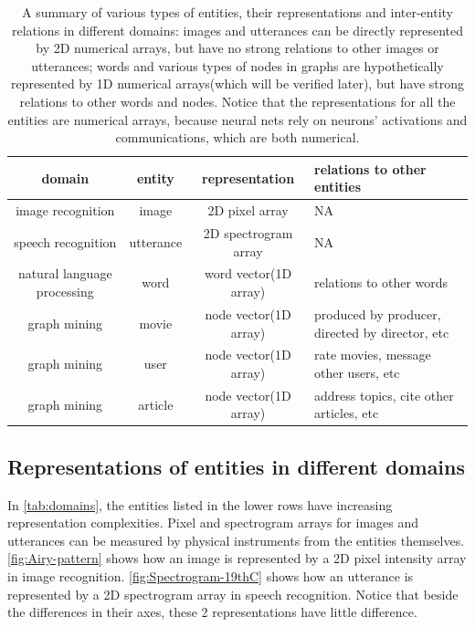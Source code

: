 \documentclass{article}
\begin{document}
\begin{table}[h]
	\centering
	\begin{tabularx}{\textwidth}{ |c|c|c|X| }
		\hline domain & entity & representation & relations to other entities \\ 
		\hline image recognition & image & 2D pixel array & NA \\ 
		\hline speech recognition & utterance & 2D spectrogram array & NA \\ 
		\hline natural language processing & word & word vector(1D array) & relations to other words \\ 
		\hline graph mining & movie & node vector(1D array) & produced by producer, directed by director, etc \\ 
		\hline graph mining & user & node vector(1D array) & rate movies, message other users, etc \\ 
		\hline graph mining & article & node vector(1D array) & address topics, cite other articles, etc \\
		\hline
	\end{tabularx}
	\caption{A summary of various types of entities, their representations and inter-entity relations in different domains: images and utterances can be directly represented by 2D numerical arrays, but have no strong relations to other images or utterances; words and various types of nodes in graphs are  hypothetically represented by 1D numerical arrays(which will be verified later), but have strong relations to other words and nodes. Notice that the representations for all the entities are numerical arrays, because neural nets rely on neurons' activations and communications, which are both numerical.}
	\label{tab:domains}
\end{table}

\subsection{Representations of entities in different domains}
In \autoref{tab:domains}, the entities listed in the lower rows have increasing representation complexities. Pixel and spectrogram arrays for images and utterances can be measured by physical instruments from the entities themselves. \autoref{fig:Airy-pattern} shows how an image is represented by a 2D pixel intensity array in image recognition. \autoref{fig:Spectrogram-19thC} shows how an utterance is represented by a 2D spectrogram array in speech recognition. Notice that beside the differences in their axes, these 2 representations have little difference.
\end{document}
